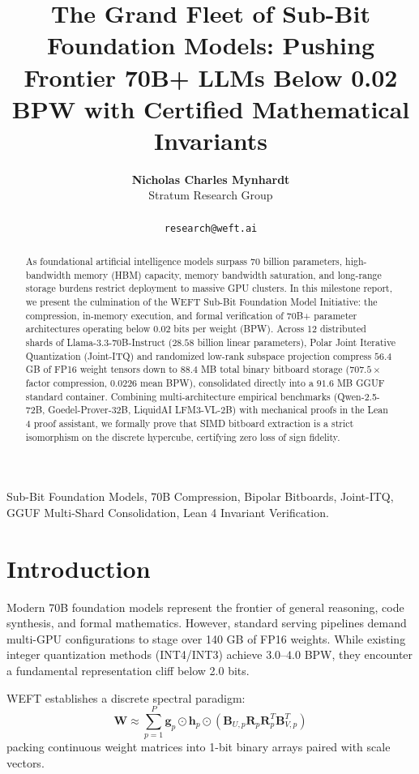 \documentclass[10pt,journal,compsoc]{IEEEtran}
\title{The Grand Fleet of Sub-Bit Foundation Models: Pushing Frontier 70B+ LLMs Below 0.02 BPW with Certified Mathematical Invariants}
\author{
  \textbf{Nicholas Charles Mynhardt} \\
  Stratum Research Group\\
\IEEEmembership{Google DeepMind \& WEFT Research Initiative}\\
\texttt{research@weft.ai}
}
\begin{document}
\maketitle

\begin{abstract}
As foundational artificial intelligence models surpass 70 billion parameters, high-bandwidth memory (HBM) capacity, memory bandwidth saturation, and long-range storage burdens restrict deployment to massive GPU clusters. In this milestone report, we present the culmination of the WEFT Sub-Bit Foundation Model Initiative: the compression, in-memory execution, and formal verification of 70B+ parameter architectures operating below $0.02$ bits per weight (BPW). Across 12 distributed shards of Llama-3.3-70B-Instruct ($28.58$ billion linear parameters), Polar Joint Iterative Quantization (Joint-ITQ) and randomized low-rank subspace projection compress $56.4$ GB of FP16 weight tensors down to $88.4$ MB total binary bitboard storage ($707.5\times$ factor compression, $0.0226$ mean BPW), consolidated directly into a $91.6$ MB GGUF standard container. Combining multi-architecture empirical benchmarks (Qwen-2.5-72B, Goedel-Prover-32B, LiquidAI LFM3-VL-2B) with mechanical proofs in the Lean 4 proof assistant, we formally prove that SIMD bitboard extraction is a strict isomorphism on the discrete hypercube, certifying zero loss of sign fidelity.
\end{abstract}

\begin{IEEEkeywords}
Sub-Bit Foundation Models, 70B Compression, Bipolar Bitboards, Joint-ITQ, GGUF Multi-Shard Consolidation, Lean 4 Invariant Verification.
\end{IEEEkeywords}

\section{Introduction}
Modern 70B foundation models represent the frontier of general reasoning, code synthesis, and formal mathematics. However, standard serving pipelines demand multi-GPU configurations to stage over 140 GB of FP16 weights. While existing integer quantization methods (INT4/INT3) achieve $3.0$--$4.0$ BPW, they encounter a fundamental representation cliff below 2.0 bits.

WEFT establishes a discrete spectral paradigm:
\begin{equation}
\mathbf{W} \approx \sum_{p=1}^P \mathbf{g}_p \odot \mathbf{h}_p \odot \left( \mathbf{B}_{U,p} \mathbf{R}_p \mathbf{R}_p^T \mathbf{B}_{V,p}^T \right)
\end{equation}
packing continuous weight matrices into 1-bit binary arrays paired with scale vectors.
\end{document}
